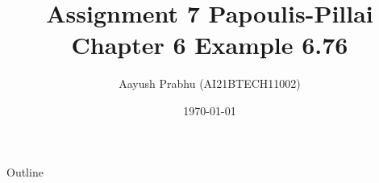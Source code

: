 \documentclass{beamer}
\DeclareMathOperator*{\Res}{Res}
\begin{document}
\newcommand{\BEQA}{\begin{eqnarray}}
\newcommand{\EEQA}{\end{eqnarray}}
\newcommand{\define}{\stackrel{\triangle}{=}}
\newcommand*\circled[1]{\tikz[baseline= (char.base)]{
    \node[shape=circle,draw,inner sep=2pt] (char) {#1};}}

\providecommand{\mbf}{\mathbf}
\providecommand{\pr}[1]{\ensuremath{\Pr\left(#1\right)}}
\providecommand{\qfunc}[1]{\ensuremath{Q\left(#1\right)}}
\providecommand{\sbrak}[1]{\ensuremath{{}\left[#1\right]}}
\providecommand{\lsbrak}[1]{\ensuremath{{}\left[#1\right.]}}
\providecommand{\rsbrak}[1]{\ensuremath{{}\left[#1\right.]}}
\providecommand{\brak}[1]{\ensuremath{\left(#1\right)}}
\providecommand{\lbrak}[1]{\ensuremath{\left(#1\right.)}
\providecommand{\rbrak}[1]{\ensuremath{\left[#1\right.]}}}
\providecommand{\cbrak}[1]{\ensuremath{\left\{#1\right\}}}
\providecommand{\lcbrak}[1]{\ensuremath{\left\{#1\right.}}
\providecommand{\rcbrak}[1]{\ensuremath{\left.#1\right\}}}
\theoremstyle{remark}
\newtheorem{rem}{Remark}
\newcommand{\sgn}{\mathop{\mathrm{sgn}}}
\providecommand{\abs}[1]{\left\vert#1\right\vert}
\providecommand{\res}[1]{\Res\displaylimits_{#1}} 
\providecommand{\norm}[1]{\left\lVert#1\right\rVert}
\providecommand{\mtx}[1]{\mathbf{#1}}
\providecommand{\mean}[1]{E\left[ #1 \right]}
\providecommand{\fourier}{\overset{\mathcal{F}}{ \rightleftharpoons}}
\providecommand{\system}{\overset{\mathcal{H}}{ \longleftrightarrow}}
\newcommand{\cosec}{\,\text{cosec}\,}
\newcommand*{\permcomb}[4][0mu]{{{}^{#3}\mkern#1#2_{#4}}}
\newcommand*{\perm}[1][-3mu]{\permcomb[#1]{P}}
\newcommand*{\comb}[1][-1mu]{\permcomb[#1]{C}}
\renewcommand{\thetable}{\arabic{table}} 
\providecommand{\dec}[2]{\ensuremath{\overset{#1}{\underset{#2}{\gtrless}}}}
\newcommand{\myvec}[1]{\ensuremath{\begin{pmatrix}#1\end{pmatrix}}}
\newcommand{\mydet}[1]{\ensuremath{\begin{vmatrix}#1\end{vmatrix}}}
\makeatletter
{}
\makeatother
\let\StandardTheFigure\thefigure{}
\let\vec\mathbf{}
\title{Assignment 7 Papoulis-Pillai Chapter 6 Example 6.76 }
\author{Aayush Prabhu (AI21BTECH11002)}
\date{\today}
\logo{\large \LaTeX}
\begin{frame}
    \titlepage 
  \end{frame}
  \logo{}
  \begin{frame}{Outline}
    \tableofcontents
  \end{frame}
\end{document}
